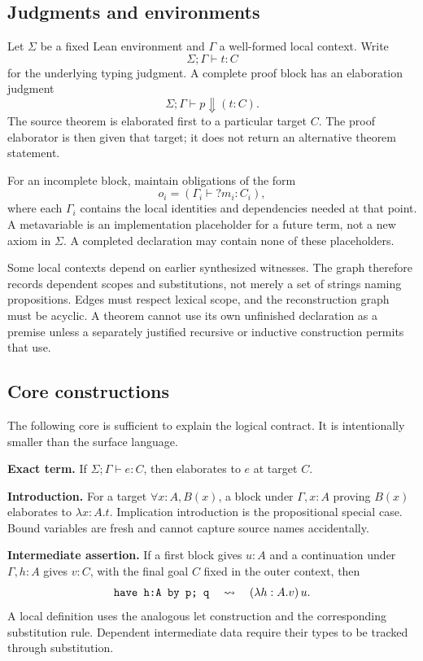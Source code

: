 \documentclass[11pt,a4paper]{article}
\theoremstyle{definition}
\theoremstyle{remark}
\numberwithin{equation}{section}
\begin{document}
\subsection{Judgments and environments}
Let $\Sigma$ be a fixed Lean environment and $\Gamma$ a well-formed local context. Write
\[
 \Sigma;\Gamma\vdash t:C
\]
for the underlying typing judgment. A complete proof block has an elaboration judgment
\[
 \Sigma;\Gamma\vdash p\Downarrow(t:C).
\]
The source theorem is elaborated first to a particular target $C$. The proof elaborator is then given that target; it does not return an alternative theorem statement.

For an incomplete block, maintain obligations of the form
\[
 o_i=(\Gamma_i\vdash {?m_i}:C_i),
\]
where each $\Gamma_i$ contains the local identities and dependencies needed at that point. A metavariable is an implementation placeholder for a future term, not a new axiom in $\Sigma$. A completed declaration may contain none of these placeholders.

Some local contexts depend on earlier synthesized witnesses. The graph therefore records dependent scopes and substitutions, not merely a set of strings naming propositions. Edges must respect lexical scope, and the reconstruction graph must be acyclic. A theorem cannot use its own unfinished declaration as a premise unless a separately justified recursive or inductive construction permits that use.

\subsection{Core constructions}
The following core is sufficient to explain the logical contract. It is intentionally smaller than the surface language.

\textbf{Exact term.} If $\Sigma;\Gamma\vdash e:C$, then \texttt{} elaborates to $e$ at target $C$.

\textbf{Introduction.} For a target $\forall x:A, B(x)$, a block under $\Gamma,x:A$ proving $B(x)$ elaborates to $\lambda x:A.t$. Implication introduction is the propositional special case. Bound variables are fresh and cannot capture source names accidentally.

\textbf{Intermediate assertion.} If a first block gives $u:A$ and a continuation under $\Gamma,h:A$ gives $v:C$, with the final goal $C$ fixed in the outer context, then
\[
 \text{\texttt{have h:A by p; q}}
 \quad\rightsquigarrow\quad
 (\lambda h:A.v)\,u.
\]
A local definition uses the analogous let construction and the corresponding substitution rule. Dependent intermediate data require their types to be tracked through substitution.
\end{document}

